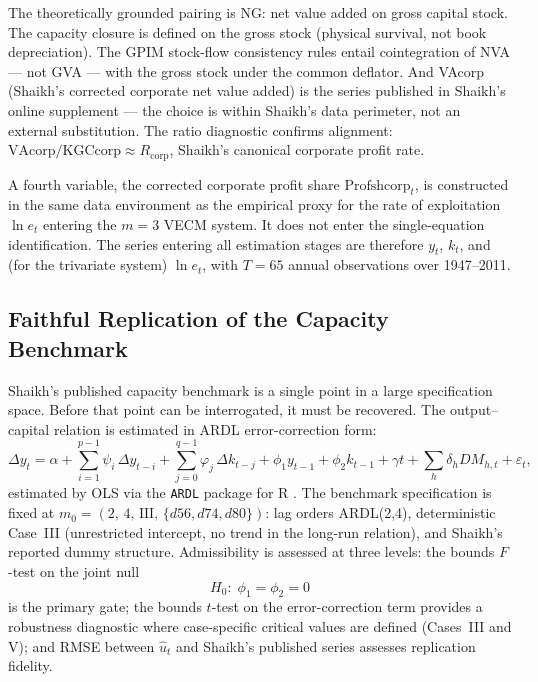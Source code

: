 \documentclass[11pt,a4paper]{article}
\begin{document}
The theoretically grounded pairing is NG: net value added on gross capital
stock. The capacity closure is defined on the gross stock (physical
survival, not book depreciation). The GPIM stock-flow consistency rules
entail cointegration of NVA --- not GVA --- with the gross stock under the
common deflator. And VAcorp (Shaikh's corrected corporate net value added)
is the series published in Shaikh's online supplement --- the choice is
within Shaikh's data perimeter, not an external substitution. The ratio
diagnostic confirms alignment:
$\text{VAcorp}/\text{KGCcorp} \approx R_{\text{corp}}$, Shaikh's canonical
corporate profit rate.

A fourth variable, the corrected corporate profit share
$\text{Profshcorp}_t$, is constructed in the same data environment as the
empirical proxy for the rate of exploitation $\ln e_t$ entering the $m = 3$
VECM system. It does not enter the single-equation identification.
The series entering all estimation stages are therefore
$y_t$, $k_t$, and (for the trivariate system) $\ln e_t$, with $T = 65$
annual observations over 1947--2011.



\subsection{Faithful Replication of the Capacity Benchmark}
\label{subsec:S0}


Shaikh's published capacity benchmark is a single point in a large
specification space. Before that point can be interrogated, it must be
recovered. The output--capital relation is estimated in ARDL
error-correction form:
%
\begin{equation}
	\label{eq:S0_ecm}
	\Delta y_t
	=
	\alpha
	+ \sum_{i=1}^{p-1} \psi_i\,\Delta y_{t-i}
	+ \sum_{j=0}^{q-1} \varphi_j\,\Delta k_{t-j}
	+ \phi_1 y_{t-1}
	+ \phi_2 k_{t-1}
	+ \gamma t
	+ \sum_h \delta_h DM_{h,t}
	+ \varepsilon_t,
\end{equation}
%
estimated by OLS via the \texttt{ARDL} package for \textsf{R}
\citep{Natsiopoulos2024}. The benchmark specification is fixed at
$m_0 = (2,\, 4,\, \text{III},\, \{d56, d74, d80\})$: lag orders ARDL(2,4),
deterministic Case~III (unrestricted intercept, no trend in the long-run
relation), and Shaikh's reported dummy structure. Admissibility is assessed
at three levels: the bounds $F$-test on the joint null
%
\begin{equation}
	\label{eq:S0_admissibility}
	H_0:\; \phi_1 = \phi_2 = 0
\end{equation}
%
is the primary gate; the bounds $t$-test on the error-correction term
provides a robustness diagnostic where case-specific critical values are
defined (Cases~III and V); and RMSE between $\widehat{u}_t$ and Shaikh's
published series assesses replication fidelity.
\end{document}
